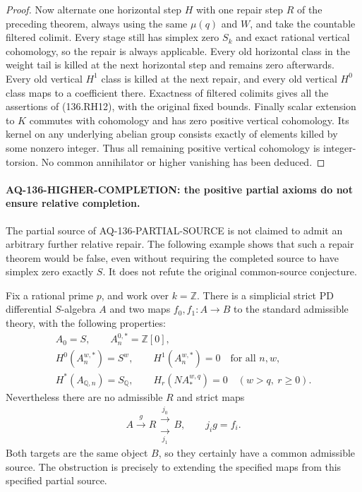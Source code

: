 \begin{proof}
Now alternate one horizontal step $H$ with one repair step
$R$ of the preceding theorem, always using the same $\mu(q)$
and $W$, and take the countable filtered colimit. Every stage
still has simplex zero $S_k$ and exact rational vertical
cohomology, so the repair is always applicable. Every old
horizontal class in the weight tail is killed at the next
horizontal step and remains zero afterwards. Every old
vertical $H^1$ class is killed at the next repair, and every
old vertical $H^0$ class maps to a coefficient there.
Exactness of filtered colimits gives all the assertions of
(136.RH12), with the original fixed bounds.
Finally scalar extension to $K$ commutes with cohomology and
has zero positive vertical cohomology. Its kernel on any
underlying abelian group consists exactly of elements killed
by some nonzero integer. Thus all remaining positive vertical
cohomology is integer-torsion. No common annihilator or higher
vanishing has been deduced.
\end{proof}


\paragraph{AQ-136-HIGHER-COMPLETION: the positive partial axioms do not ensure relative completion.}
The partial source of AQ-136-PARTIAL-SOURCE is not claimed to
admit an arbitrary further relative repair. The following example
shows that such a repair theorem would be false, even without
requiring the completed source to have simplex zero exactly $S$.
It does not refute the original common-source conjecture.

Fix a rational prime $p$, and work over $k=\mathbb Z$.
There is a simplicial strict PD differential $S$-algebra $A$
and two maps $f_0,f_1:A\to B$ to the standard admissible
theory, with the following properties:
\[
 \begin{gathered}
 A_0=S,\qquad A_n^{0,*}=\mathbb Z[0],\\
 H^0(A_n^{w,*})=S^w,\qquad H^1(A_n^{w,*})=0
                                      \quad\text{for all }n,w,\\
 H^*(A_{\mathbb Q,n})=S_{\mathbb Q},\qquad
 H_r(N A_*^{w,q})=0\quad(w>q,\ r\ge0).
 \end{gathered}                                            \tag{136.HC1}
\]
Nevertheless there are no admissible $R$ and strict maps
\[
            A\xrightarrow{g}R
                    \mathrel{\substack{\xrightarrow{j_0}\\[-3pt]
                                      \xrightarrow[j_1]{}}}B,
                 \qquad j_i g=f_i.                       \tag{136.HC2}
\]
Both targets are the same object $B$, so they certainly have
a common admissible source. The obstruction is precisely to
extending the specified maps from this specified partial source.

